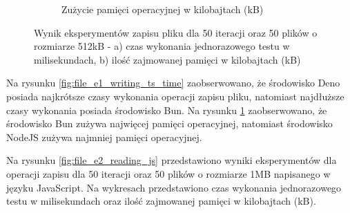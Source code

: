\begin{figure}[H]
\begin{subfigure}[b]{0.42\textwidth}
    \caption{Zużycie pamięci operacyjnej w kilobajtach (kB)}
    \label{fig:file_e1_writing_ts_memory}
  \end{subfigure}
  \caption{Wynik eksperymentów zapisu pliku dla 50 iteracji oraz 50 plików o rozmiarze 512kB - a) czas wykonania jednorazowego testu w milisekundach, b) ilość zajmowanej pamięci w kilobajtach (kB)}
  \label{fig:file_e1_writing_ts}
\end{figure}

Na rysunku \ref{fig:file_e1_writing_ts_time} zaobserwowano, że środowisko Deno posiada najkrótsze czasy wykonania operacji zapisu pliku, natomiast najdłuższe czasy wykonania posiada środowisko Bun. Na rysunku \ref{fig:file_e1_writing_ts_memory} zaobserwowano, że środowisko Bun zużywa najwięcej pamięci operacyjnej, natomiast środowisko NodeJS zużywa najmniej pamięci operacyjnej.

Na rysunku \ref{fig:file_e2_reading_js} przedstawiono wyniki eksperymentów dla operacji zapisu dla 50 iteracji oraz 50 plików o rozmiarze 1MB napisanego w języku JavaScript. Na wykresach przedstawiono czas wykonania jednorazowego testu w milisekundach oraz ilość zajmowanej pamięci w kilobajtach (kB).

